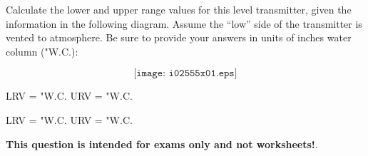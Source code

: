

Calculate the lower and upper range values for this level transmitter, given the information in the following diagram.  Assume the ``low'' side of the transmitter is vented to atmosphere.  Be sure to provide your answers in units of inches water column ("W.C.):

$$\texttt{[image: i02555x01.eps]}$$

LRV = \underbar{\hskip 50pt} "W.C. \hskip 100pt URV = \underbar{\hskip 50pt} "W.C.







LRV =  "W.C. \hskip 100pt URV =  "W.C.







{\bf This question is intended for exams only and not worksheets!}.




